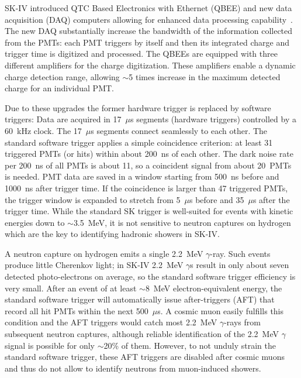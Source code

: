 \label{sec:softtrig}


SK-IV introduced QTC Based Electronics with Ethernet (QBEE) and new data acquisition (DAQ) computers allowing for enhanced data processing capability~\cite{Nishino:2009zu}. The new DAQ substantially increase the bandwidth of the information collected from the PMTs: each PMT triggers by itself and then its integrated charge and trigger time is digitized and processed. The QBEEs are equipped with three different amplifiers for the charge digitization. These amplifiers enable a dynamic charge detection range, allowing $\sim$5 times increase in the maximum detected charge for an individual PMT. 

Due to these upgrades the former hardware trigger is replaced by software triggers: Data are acquired in 17~$\mu$s segments (hardware triggers) controlled by a 60~kHz clock. The 17~$\mu$s segments connect seamlessly to each other. The standard software trigger applies a simple coincidence criterion: at least 31 triggered PMTs (or hits) within about 200~ns of each other. The dark noise rate per 200~ns of all PMTs is about 11, so a coincident signal from about 20~PMTs is needed. PMT data are saved in a window starting from 500~ns before and 1000~ns after trigger time. If the coincidence is larger than 47 triggered PMTs, the trigger window is expanded to stretch from 5~$\mu$s before and 35~$\mu$s after the trigger time. While the standard SK trigger is well-suited for events with kinetic energies down to $\sim$3.5~MeV, it is not sensitive to neutron captures on hydrogen which are the key to identifying hadronic showers in SK-IV.

A neutron capture on hydrogen emits a single 2.2~MeV $\gamma$-ray. Such events produce little Cherenkov light; in SK-IV 2.2~MeV $\gamma$s result in only about seven detected photo-electrons on average, so the standard software trigger efficiency is very small. After an event of at least $\sim$8~MeV electron-equivalent energy, the standard software trigger will automatically issue after-triggers (AFT) that record all hit PMTs within the next 500~$\mu$s. A cosmic muon easily fulfills this condition and the AFT triggers would catch most 2.2~MeV $\gamma$-rays from subsequent neutron captures, although reliable identification of the 2.2~MeV $\gamma$ signal is possible for only $\sim$20\% of them. However, to not unduly strain the standard software trigger, these AFT triggers are disabled after cosmic muons and thus do not allow to identify neutrons from muon-induced showers. 


